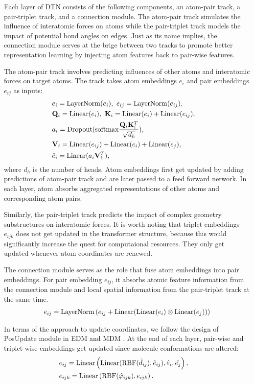 \documentclass[letterpaper]{article}
\begin{document}
Each layer of DTN consists of the following components, an atom-pair track, a pair-triplet track, and a connection module. The atom-pair track simulates the influence of interatomic forces on atoms while the pair-triplet track models the impact of potential bond angles on edges. Just as its name implies, the connection module serves at the brige between two tracks to promote better representation learning by injecting atom features back to pair-wise features.

The atom-pair track involves predicting influences of other atoms and interatomic forces on target atoms. The track takes atom embeddings $e_i$ and pair embeddings $e_{ij}$ as inputs:
\begin{eqnarray}
&e_i = {\rm LayerNorm}(e_i), \ e_{ij} = {\rm LayerNorm}(e_{ij}),& \\
&\mathbf{Q}_i = {\rm Linear}(e_i), \ \mathbf{K}_i = {\rm Linear}(e_i) + {\rm Linear}(e_{ij}),& \\
&a_i = {\rm Dropout}({\rm softmax} \frac{\mathbf{Q}_i \mathbf{K}_i^T}{\sqrt{d_h}}), & \\
&\mathbf{V}_i = {\rm Linear}(e_{ij}) + {\rm Linear}(e_{i}) + {\rm Linear}(e_{j}),& \\
&\hat{e}_i = {\rm Linear}(a_i \mathbf{V}_i^T),&
\end{eqnarray}
where $d_h$ is the number of heads. Atom embeddings first get updated by adding predictions of atom-pair track and are later passed to a feed forward network. In each layer, atom absorbs aggregated representations of other atoms and corresponding atom pairs.

Similarly, the pair-triplet track predicts the impact of complex geometry substructures on interatomic forces.
It is worth noting that triplet embeddings $e_{ijk}$ does not get updated in the transformer structure, because this would significantly increase the quest for computaional resources. They only get updated whenever atom coordinates are renewed.

The connection module serves as the role that fuse atom embeddings into pair embeddings. For pair embedding $e_{ij}$, it absorbs atomic feature information from the connection module and local spatial information from the pair-triplet track at the same time.
\begin{equation}
e_{ij} = {\rm LayerNorm}\left(e_{ij} + {\rm Linear}({\rm Linear}(e_i) \otimes {\rm Linear}(e_j))\right)
\end{equation}

In terms of the approach to update coordinates, we follow the design of PosUpdate module in EDM \cite{edm_22_hoogeboom} and MDM \cite{mdm_23_huang}. At the end of each layer, pair-wise and triplet-wise embeddings get updated since molecule conformations are altered:
\begin{eqnarray}
&e_{ij} = {\rm Linear}\left({\rm Linear}({\rm RBF}(\hat{d}_{ij}), \hat{e}_{ij}), \hat{e}_i, \hat{e_j}\right),&\\
&e_{ijk} = {\rm Linear}\left({\rm RBF}(\hat{\varphi}_{ijk}), e_{ijk}\right). &
\end{eqnarray}
\end{document}
